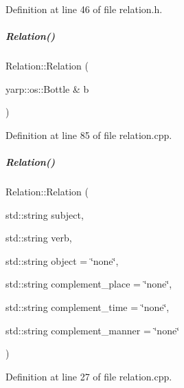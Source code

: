 Definition at line 46 of file relation.\+h.

\mbox{\label{group__icubclient__representations_a87209b6621a3a92e9a839cbf1874e102}} 
\subparagraph{\texorpdfstring{Relation()}{Relation()}\hspace{0.1cm}{\footnotesize\ttfamily [2/4]}}
{\footnotesize\ttfamily Relation\+::\+Relation (\begin{DoxyParamCaption}\item[{yarp\+::os\+::\+Bottle \&}]{b }\end{DoxyParamCaption})}



Definition at line 85 of file relation.\+cpp.

\mbox{\label{group__icubclient__representations_abd844358bc71826a1a6bf50d66a283bb}} 
\subparagraph{\texorpdfstring{Relation()}{Relation()}\hspace{0.1cm}{\footnotesize\ttfamily [3/4]}}
{\footnotesize\ttfamily Relation\+::\+Relation (\begin{DoxyParamCaption}\item[{std\+::string}]{subject,  }\item[{std\+::string}]{verb,  }\item[{std\+::string}]{object = {\ttfamily \char`\"{}none\char`\"{}},  }\item[{std\+::string}]{complement\+\_\+place = {\ttfamily \char`\"{}none\char`\"{}},  }\item[{std\+::string}]{complement\+\_\+time = {\ttfamily \char`\"{}none\char`\"{}},  }\item[{std\+::string}]{complement\+\_\+manner = {\ttfamily \char`\"{}none\char`\"{}} }\end{DoxyParamCaption})}



Definition at line 27 of file relation.\+cpp.

